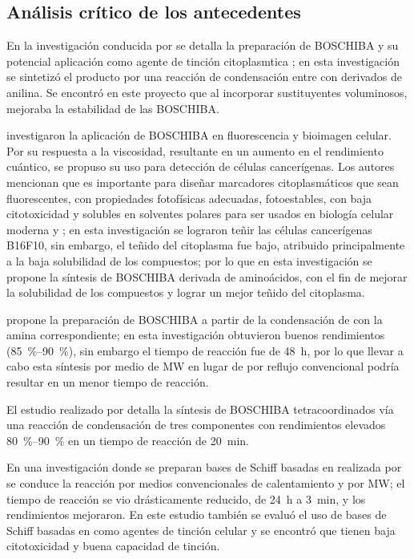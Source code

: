 \subsection{Análisis crítico de los antecedentes}

En la investigación conducida por \textcite{corona-lopezSynthesisCharacterizationPhotophysical2017} se detalla la preparación de \gls{BOSCHIBA} y su potencial aplicación como agente de tinción citoplasmtica \invitro{}; en esta investigación se sintetizó el producto por una reacción de condensación entre  con derivados de anilina. Se encontró en este proyecto que al incorporar sustituyentes voluminosos, mejoraba la estabilidad de las \gls{BOSCHIBA}.

\textcite{ibarra-rodriguezOrganoboronSchiffBases2019} investigaron la aplicación de \gls{BOSCHIBA} en fluorescencia y bioimagen celular. Por su respuesta a la viscosidad, resultante en un aumento en el rendimiento cuántico, se propuso su uso para detección de células cancerígenas. Los autores mencionan que es importante para diseñar marcadores citoplasmáticos que sean fluorescentes, con propiedades fotofísicas adecuadas, fotoestables, con baja citotoxicidad y solubles en solventes polares para ser usados en biología celular moderna \invitro{} y \invivo{}; en esta investigación se lograron teñir las células cancerígenas B16F10, sin embargo, el teñido del citoplasma fue bajo, atribuido principalmente a la baja solubilidad de los compuestos; por lo que en esta investigación se propone la síntesis de \gls{BOSCHIBA} derivada de aminoácidos, con el fin de mejorar la solubilidad de los compuestos y lograr un mejor teñido del citoplasma.

\textcite{corona-lopezFarRedInfrared2021} propone la preparación de \gls{BOSCHIBA} a partir de la condensación de  con la amina correspondiente; en esta investigación obtuvieron buenos rendimientos  (\qtyrange{85}{90}{\percent}), sin embargo el tiempo de reacción fue de \qty{48}{\hour}, por lo que llevar a cabo esta síntesis por medio de \gls{MW} en lugar de por reflujo convencional podría resultar en un menor tiempo de reacción.

El estudio realizado por \textcite{garcia-lopezNewLuminescentOrganoboron2022} detalla la síntesis de \gls{BOSCHIBA} tetracoordinados vía una reacción de condensación de tres componentes con rendimientos elevados \qtyrange{80}{90}{\percent} en un tiempo de reacción de \qty{20}{\minute}.

En una investigación donde se preparan bases de Schiff basadas en  realizada por \textcite{lopez-espejelOrganotinSchiffBases2021} se conduce la reacción por medios convencionales de calentamiento y por \gls{MW}; el tiempo de reacción se vio drásticamente reducido, de \qty{24}{\hour} a \qty{3}{\minute}, y los rendimientos mejoraron. En este estudio también se evaluó el uso de bases de Schiff basadas en  como agentes de tinción celular y se encontró que tienen baja citotoxicidad y buena capacidad de tinción.
